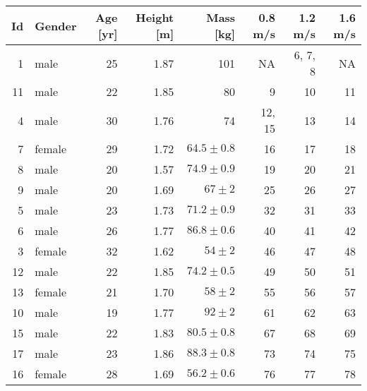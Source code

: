\begin{tabular}{rlrrrrrr}
\toprule
 Id &  Gender &  Age [yr] & Height [m] &                     Mass [kg] & 0.8 m/s &  1.2 m/s & 1.6 m/s \\
\midrule
  1 &    male &        25 &       1.87 &                           101 &      NA &  6, 7, 8 &      NA \\
 11 &    male &        22 &       1.85 &                            80 &       9 &       10 &      11 \\
  4 &    male &        30 &       1.76 &                            74 &  12, 15 &       13 &      14 \\
\midrule[0.25pt]
  7 &  female &        29 &       1.72 &  $64.5\pm0.8$ &      16 &       17 &      18 \\
  8 &    male &        20 &       1.57 &  $74.9\pm0.9$ &      19 &       20 &      21 \\
  9 &    male &        20 &       1.69 &      $67\pm2$ &      25 &       26 &      27 \\
  5 &    male &        23 &       1.73 &  $71.2\pm0.9$ &      32 &       31 &      33 \\
  6 &    male &        26 &       1.77 &  $86.8\pm0.6$ &      40 &       41 &      42 \\
  3 &  female &        32 &       1.62 &      $54\pm2$ &      46 &       47 &      48 \\
 12 &    male &        22 &       1.85 &  $74.2\pm0.5$ &      49 &       50 &      51 \\
 13 &  female &        21 &       1.70 &      $58\pm2$ &      55 &       56 &      57 \\
 10 &    male &        19 &       1.77 &      $92\pm2$ &      61 &       62 &      63 \\
 15 &    male &        22 &       1.83 &  $80.5\pm0.8$ &      67 &       68 &      69 \\
 17 &    male &        23 &       1.86 &  $88.3\pm0.8$ &      73 &       74 &      75 \\
 16 &  female &        28 &       1.69 &  $56.2\pm0.6$ &      76 &       77 &      78 \\
\bottomrule
\end{tabular}
